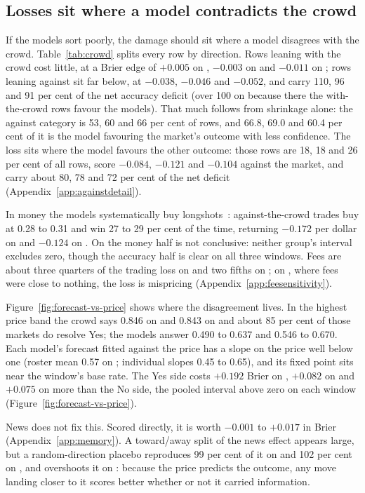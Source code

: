 \subsection{Losses sit where a model contradicts the crowd}
\label{sec:results-crowd}

If the models sort poorly, the damage should sit where a model disagrees with the
crowd. Table~\ref{tab:crowd} splits every row by direction. Rows leaning with
the crowd cost little, at a Brier edge of $+0.005$ on \winA, $-0.003$ on \winB
and $-0.011$ on \winC; rows leaning against sit far below, at $-0.038$, $-0.046$
and $-0.052$, and carry 110, 96 and 91 per cent of the net accuracy deficit (over
100 on \winA because there the with-the-crowd rows favour the models). That much
follows from shrinkage alone: the against category is 53, 60 and 66 per cent of
rows, and 66.8, 69.0 and 60.4 per cent of it is the model favouring the market's
outcome with less confidence. The loss sits where the model favours the other
outcome: those rows are 18, 18 and 26 per cent of all rows, score $-0.084$,
$-0.121$ and $-0.104$ against the market, and carry about 80, 78 and 72 per cent
of the net deficit (Appendix~\ref{app:againstdetail}).

In money the models systematically buy longshots~\citep{snowberg2010}:
against-the-crowd trades buy at 0.28 to 0.31 and win 27 to 29 per cent of the
time, returning $-0.172$ per dollar on \winA and $-0.124$ on \winC. On \winB the
money half is not conclusive: neither group's interval excludes zero, though the
accuracy half is clear on all three windows. Fees are about three quarters of
the trading loss on \winB and two fifths on \winC; on \winA, where fees were
close to nothing, the loss is mispricing (Appendix~\ref{app:feesensitivity}).

Figure~\ref{fig:forecast-vs-price} shows where the disagreement lives. In the
highest price band the crowd says 0.846 on \winB and 0.843 on \winC and about 85
per cent of those markets do resolve Yes; the models answer 0.490 to 0.637 and
0.546 to 0.670. Each model's forecast fitted against the price has a slope on the price well below one
(roster mean 0.57 on \winB; individual slopes 0.45 to 0.65), and its fixed point
sits near the window's base rate. The Yes side costs $+0.192$ Brier
on \winA, $+0.082$ on \winB and $+0.075$ on \winC more than the No side, the
pooled interval above zero on each window (Figure~\ref{fig:forecast-vs-price}).

News does not fix this. Scored directly, it is worth $-0.001$ to $+0.017$
in Brier (Appendix~\ref{app:memory}). A toward/away split of the news effect
appears large, but a random-direction placebo reproduces 99 per cent of it on
\winB and 102 per cent on \winC, and overshoots it on \winA: because the price predicts the outcome, any move
landing closer to it scores better whether or not it carried information.


